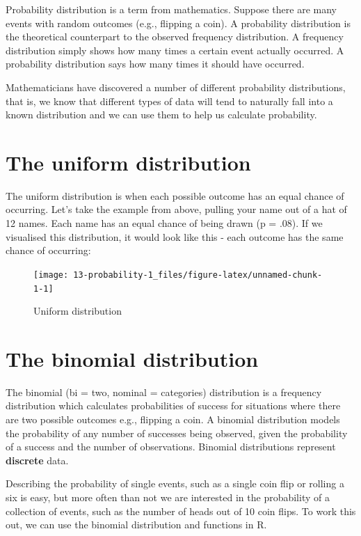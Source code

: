 \documentclass[
  oneside]{book}
\begin{document}
Probability distribution is a term from mathematics. Suppose there are many events with random outcomes (e.g., flipping a coin). A probability distribution is the theoretical counterpart to the observed frequency distribution. A frequency distribution simply shows how many times a certain event actually occurred. A probability distribution says how many times it should have occurred.

Mathematicians have discovered a number of different probability distributions, that is, we know that different types of data will tend to naturally fall into a known distribution and we can use them to help us calculate probability.

\hypertarget{the-uniform-distribution}{%
\section{The uniform distribution}\label{the-uniform-distribution}}

The uniform distribution is when each possible outcome has an equal chance of occurring. Let's take the example from above, pulling your name out of a hat of 12 names. Each name has an equal chance of being drawn (p = .08). If we visualised this distribution, it would look like this - each outcome has the same chance of occurring:

\begin{figure}

{\centering \texttt{[image: 13-probability-1\_files/figure-latex/unnamed-chunk-1-1]} 

}

\caption{Uniform distribution}\label{fig:unnamed-chunk-1}
\end{figure}

\hypertarget{the-binomial-distribution}{%
\section{The binomial distribution}\label{the-binomial-distribution}}

The binomial (bi = two, nominal = categories) distribution is a frequency distribution which calculates probabilities of success for situations where there are two possible outcomes e.g., flipping a coin. A binomial distribution models the probability of any number of successes being observed, given the probability of a success and the number of observations. Binomial distributions represent \textbf{discrete} data.

Describing the probability of single events, such as a single coin flip or rolling a six is easy, but more often than not we are interested in the probability of a collection of events, such as the number of heads out of 10 coin flips. To work this out, we can use the binomial distribution and functions in R.
\end{document}
